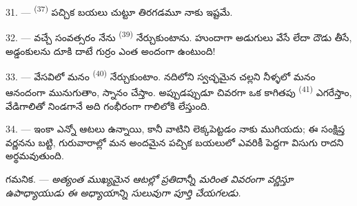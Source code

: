 \VUsaut{4.6mm}
\VUsaut{3.0mm}

31. ---  \textsuperscript{(37)} పచ్చిక బయలు చుట్టూ తిరగడమూ నాకు ఇష్టమే.

32. --- వచ్చే సంవత్సరం నేను  \textsuperscript{(39)} నేర్చుకుంటాను.
హుందాగా అడుగులు వేసే లేదా దౌడు తీసే, అడ్డంకులను దూకి దాటే గుర్రం ఎంత అందంగా ఉంటుంది!

33. --- వేసవిలో మనం  \textsuperscript{(40)} నేర్చుకుంటాం. నదిలోని స్వచ్ఛమైన చల్లని
నీళ్ళలో మనం ఆనందంగా మునుగుతాం, స్నానం చేస్తాం. అప్పుడప్పుడూ చివరగా ఒక కాగితపు 
\textsuperscript{(41)} ఎగరేస్తాం, వేడిగాలితో నిండగానే అది గంభీరంగా గాలిలోకి లేస్తుంది.

34. --- ఇంకా ఎన్నో ఆటలు ఉన్నాయి, కానీ వాటిని లెక్కపెట్టడం నాకు ముగియదు; ఈ సంక్షిప్త వర్ణనను
బట్టి, గురువారాల్లో మన అందమైన పచ్చిక బయలులో ఎవరికీ పెద్దగా విసుగు రాదని అర్థమవుతుంది.

గమనిక. ---
\textit{అత్యంత ముఖ్యమైన ఆటల్లో ప్రతిదాన్నీ మరింత వివరంగా వర్ణిస్తూ ఉపాధ్యాయుడు ఈ అధ్యాయాన్ని సులువుగా పూర్తి చేయగలడు.}
